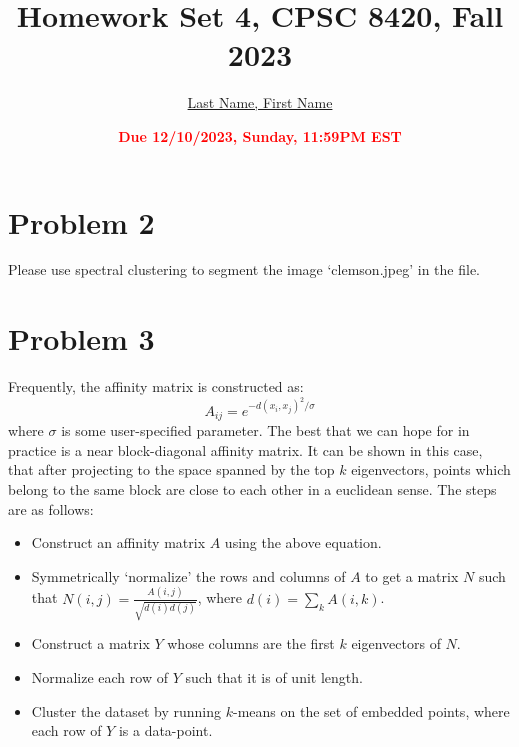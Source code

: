 \documentclass[11pt]{article}
\title{{\bf Homework Set 4, CPSC 8420, Fall 2023}} %
\author{\Large\underline{Last Name, First Name}}
\date{\textbf{\Large\textcolor{red}{Due 12/10/2023, Sunday, 11:59PM EST}}} %
\begin{document}
\maketitle

%
\section*{Problem 2}
Please use spectral clustering to segment the image `clemson.jpeg' in the file.
\newpage

\section*{Problem 3}
Frequently, the affinity matrix is constructed as:
\begin{equation}
	A_{ij}=e^{-d(x_i,x_j)^2/\sigma}
\end{equation}
where $\sigma$  is some user-specified parameter. The best that we can hope for in practice is a near block-diagonal
affinity matrix. It can be shown in this case, that after projecting to the space spanned by the top $k$
eigenvectors, points which belong to the same block are close to each other in a euclidean sense. The steps are as follows:
\begin{itemize}
	\item Construct an affinity matrix $A$ using the above equation.
	\item Symmetrically `normalize’ the rows and columns of $A$ to get a matrix $N$ such that $N(i,j)=\frac{A(i,j)}{\sqrt{d(i)d(j)}}$, where $d(i)=\sum_k A(i,k)$.
	\item Construct a matrix $Y$ whose columns are the first $k$ eigenvectors of $N$.
	\item Normalize each row of $Y$ such that it is of unit length.
	\item Cluster the dataset by running $k$-means on the set of  embedded points, where each row of $Y$ is a data-point.
\end{itemize}
\end{document}
